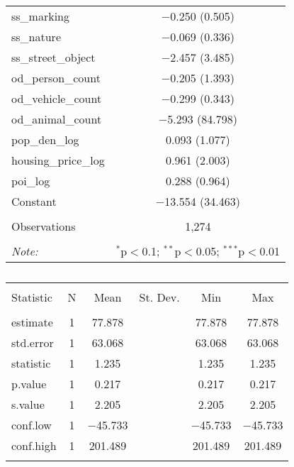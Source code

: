 \begin{table}[!htbp]
\begin{tabular}{@{\extracolsep{1pt}}lc}
  ss\_marking & $-$0.250 (0.505) \\ 
  ss\_nature & $-$0.069 (0.336) \\ 
  ss\_street\_object & $-$2.457 (3.485) \\ 
  od\_person\_count & $-$0.205 (1.393) \\ 
  od\_vehicle\_count & $-$0.299 (0.343) \\ 
  od\_animal\_count & $-$5.293 (84.798) \\ 
  pop\_den\_log & 0.093 (1.077) \\ 
  housing\_price\_log & 0.961 (2.003) \\ 
  poi\_log & 0.288 (0.964) \\ 
  Constant & $-$13.554 (34.463) \\ 
 \hline \\[-1.8ex] 
Observations & 1,274 \\ 
\hline 
\hline \\[-1.8ex] 
\textit{Note:}  & \multicolumn{1}{r}{$^{*}$p$<$0.1; $^{**}$p$<$0.05; $^{***}$p$<$0.01} \\ 
\end{tabular} 
\end{table} 

\begin{table}[!htbp] \centering 
  \caption{} 
  \label{} 
\small 
\begin{tabular}{@{\extracolsep{1pt}}lccccc} 
\\[-1.8ex]\hline 
\hline \\[-1.8ex] 
Statistic & \multicolumn{1}{c}{N} & \multicolumn{1}{c}{Mean} & \multicolumn{1}{c}{St. Dev.} & \multicolumn{1}{c}{Min} & \multicolumn{1}{c}{Max} \\ 
\hline \\[-1.8ex] 
estimate & 1 & 77.878 &  & 77.878 & 77.878 \\ 
std.error & 1 & 63.068 &  & 63.068 & 63.068 \\ 
statistic & 1 & 1.235 &  & 1.235 & 1.235 \\ 
p.value & 1 & 0.217 &  & 0.217 & 0.217 \\ 
s.value & 1 & 2.205 &  & 2.205 & 2.205 \\ 
conf.low & 1 & $-$45.733 &  & $-$45.733 & $-$45.733 \\ 
conf.high & 1 & 201.489 &  & 201.489 & 201.489 \\ 
\hline \\[-1.8ex] 
\end{tabular} 
\end{table} 

